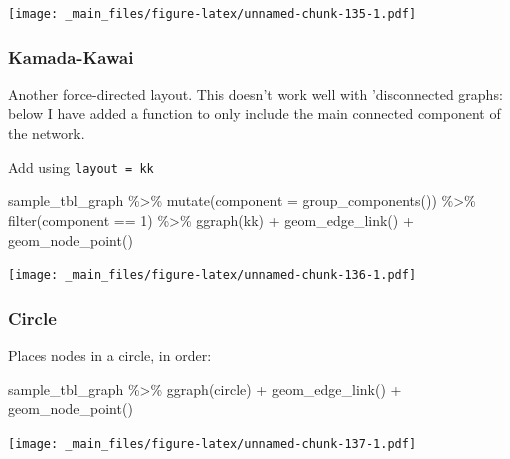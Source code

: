 \documentclass[
]{book}
\newenvironment{Shaded}{\begin{snugshade}}{\end{snugshade}}
\newcommand{\AttributeTok}[1]{\textcolor[rgb]{0.77,0.63,0.00}{#1}}
\newcommand{\DecValTok}[1]{\textcolor[rgb]{0.00,0.00,0.81}{#1}}
\newcommand{\FunctionTok}[1]{\textcolor[rgb]{0.00,0.00,0.00}{#1}}
\newcommand{\NormalTok}[1]{#1}
\newcommand{\SpecialCharTok}[1]{\textcolor[rgb]{0.00,0.00,0.00}{#1}}
\newcommand{\StringTok}[1]{\textcolor[rgb]{0.31,0.60,0.02}{#1}}
\begin{document}
\texttt{[image: \_main\_files/figure-latex/unnamed-chunk-135-1.pdf]}

\hypertarget{kamada-kawai}{%
\subsubsection{Kamada-Kawai}\label{kamada-kawai}}

Another force-directed layout. This doesn't work well with 'disconnected graphs: below I have added a function to only include the main connected component of the network.

Add using \texttt{layout\ =\ \textquotesingle{}kk\textquotesingle{}}

\begin{Shaded}
\begin{Highlighting}[]
\NormalTok{sample\_tbl\_graph }\SpecialCharTok{\%\textgreater{}\%} 
  \FunctionTok{mutate}\NormalTok{(}\AttributeTok{component =} \FunctionTok{group\_components}\NormalTok{()) }\SpecialCharTok{\%\textgreater{}\%} 
  \FunctionTok{filter}\NormalTok{(component }\SpecialCharTok{==} \DecValTok{1}\NormalTok{) }\SpecialCharTok{\%\textgreater{}\%} 
  \FunctionTok{ggraph}\NormalTok{(}\StringTok{\textquotesingle{}kk\textquotesingle{}}\NormalTok{) }\SpecialCharTok{+} 
  \FunctionTok{geom\_edge\_link}\NormalTok{() }\SpecialCharTok{+} 
  \FunctionTok{geom\_node\_point}\NormalTok{()}
\end{Highlighting}
\end{Shaded}

\texttt{[image: \_main\_files/figure-latex/unnamed-chunk-136-1.pdf]}

\hypertarget{circle}{%
\subsubsection{Circle}\label{circle}}

Places nodes in a circle, in order:

\begin{Shaded}
\begin{Highlighting}[]
\NormalTok{sample\_tbl\_graph }\SpecialCharTok{\%\textgreater{}\%} 
  \FunctionTok{ggraph}\NormalTok{(}\StringTok{\textquotesingle{}circle\textquotesingle{}}\NormalTok{) }\SpecialCharTok{+} 
  \FunctionTok{geom\_edge\_link}\NormalTok{() }\SpecialCharTok{+} 
  \FunctionTok{geom\_node\_point}\NormalTok{()}
\end{Highlighting}
\end{Shaded}

\texttt{[image: \_main\_files/figure-latex/unnamed-chunk-137-1.pdf]}
\end{document}
